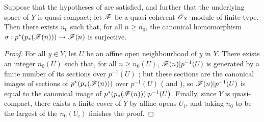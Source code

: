 \begin{corollary}[3.4.6]
\label{II.3.4.6}
Suppose that the hypotheses of  are satisfied, and further that the underlying space of $Y$ is quasi-compact;
let $\mathscr{F}$ be a quasi-coherent $\mathscr{O}_X$-module of finite type.
Then there exists $n_0$ such that, for all $n\geq n_0$, the canonical homomorphism $\sigma:p^*(p_*(\sh{F}(n)))\to\sh{F}(n)$  is surjective.
\end{corollary}

\begin{proof}
For all $y\in Y$, let $U$ be an affine open neighbourhood of $y$ in $Y$.
There exists an integer $n_0(U)$ such that, for all $n\geq n_0(U)$, $\mathscr{F}(n)|p^{-1}(U)$ is generated by a finite number of its sections over $p^{-1}(U)$ ;
but these sections are the canonical images of sections of $p^*(p_*(\mathscr{F}(n)))$ over $p^{-1}(U)$ ( and ), so $\mathscr{F}(n)|p^{-1}(U)$ is equal to the canonical image of $p^*(p_*(\mathscr{F}(n)))|p^{-1}(U)$.
Finally, since $Y$ is quasi-compact, there exists a finite cover of $Y$ by affine opens $U_i$, and taking $n_0$ to be the largest of the $n_0(U_i)$ finishes the proof.
\end{proof}

